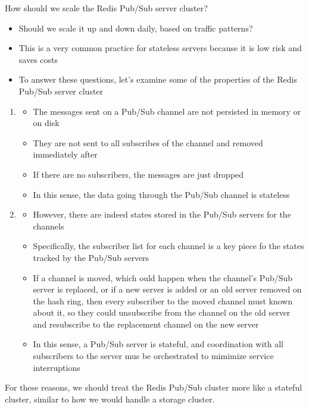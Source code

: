 \documentclass{report}
\theoremstyle{definition}
\begin{document}
How should we scale the Redis Pub/Sub server cluster?

\begin{itemize}
\item
Should we scale it up and down daily, based on traffic patterns?
\item
This  is a very common practice for stateless servers because it is low risk and saves costs
\item
To answer these questions, let's examine some of the properties of the Redis Pub/Sub server cluster
\end{itemize}

\begin{enumerate}
\item

\begin{itemize}
\item
The messages sent on a Pub/Sub channel are not persisted in memory or on disk
\item
They are not sent to all subscribes of the channel and removed immediately after
\item
If there are no subscribers, the messages are just dropped
\item
In this sense, the data going through the Pub/Sub channel is stateless
\end{itemize}

\item

\begin{itemize}
\item
However, there are indeed states stored in the Pub/Sub servers for the channels
\item
Specifically, the subscriber list for each channel is a key piece fo the states tracked by the Pub/Sub servers
\item
If a channel is moved, which ould happen when the channel's Pub/Sub server is replaced, or if a new server is added or an old server removed on the hash ring, then every subscriber to the moved channel must known about it, so they could unsubscribe from the channel on the old server and resubscribe to the replacement channel on the new server
\item
In this sense, a Pub/Sub server is stateful, and coordination with all subscribers to the server mus be orchestrated to mimimize service interruptions
\end{itemize}
\end{enumerate}

For these reasons, we should treat the Redis Pub/Sub cluster more like a stateful cluster, similar to how we would handle a storage cluster.
\end{document}
